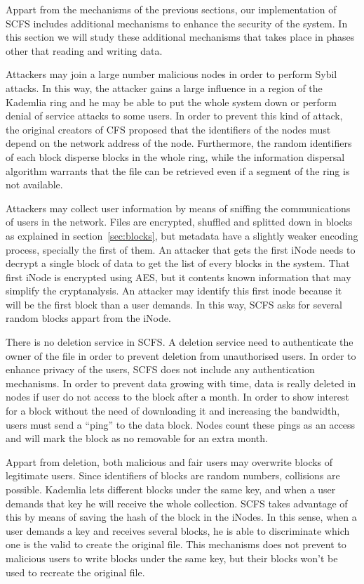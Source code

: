 \documentclass{llncs}
\begin{document}
Appart from the mechanisms of the previous sections, our implementation of SCFS includes additional mechanisms to enhance the security of the system. In this section we will study these additional mechanisms that takes place in phases other that reading and writing data.

Attackers may join a large number malicious nodes in order to perform Sybil attacks. In this way, the attacker gains a large influence in a region of the Kademlia ring and he may be able to put the whole system down or perform denial of service attacks to some users. In order to prevent this kind of attack, the original creators of CFS proposed that the identifiers of the nodes must depend on the network address of the node. Furthermore, the random identifiers of each block disperse blocks in the whole ring, while the information dispersal algorithm warrants that the file can be retrieved even if a segment of the ring is not available.

Attackers may collect user information by means of sniffing the communications of users in the network. Files are
encrypted, shuffled and splitted down in blocks as explained in section~\ref{sec:blocks}, but metadata have a slightly
weaker encoding process, specially the first of them. An attacker that gets the first iNode needs to decrypt a single
block of data to get the list of every blocks in the system. That first iNode is encrypted using AES, but it contents
known information that may simplify the cryptanalysis. An attacker may identify this first inode because it will be
the first block than a user demands. In this way, SCFS asks for several random blocks appart from the iNode.

There is no deletion service in SCFS. A deletion service need to authenticate the owner of the file in order to prevent deletion from unauthorised users. In order to enhance privacy of the users, SCFS does not include any authentication mechanisms. In order to prevent data growing with time, data is really deleted in nodes if user do not access to the block after a month. In order to show interest for a block without the need of downloading it and increasing the bandwidth, users must send a ``ping'' to the data block. Nodes count these pings as an access and will mark the block as no removable for an extra month.

Appart from deletion, both malicious and fair users may overwrite blocks of legitimate users. Since identifiers of blocks are random numbers, collisions are possible. Kademlia lets different blocks under the same key, and when a user demands that key he will receive the whole collection. SCFS takes advantage of this by means of saving the hash of the block in the iNodes. In this sense, when a user demands a key and receives several blocks, he is able to discriminate which one is the valid to create the original file. This mechanisms does not prevent to malicious users to write blocks under the same key, but their blocks won't be used to recreate the original file.
\end{document}
